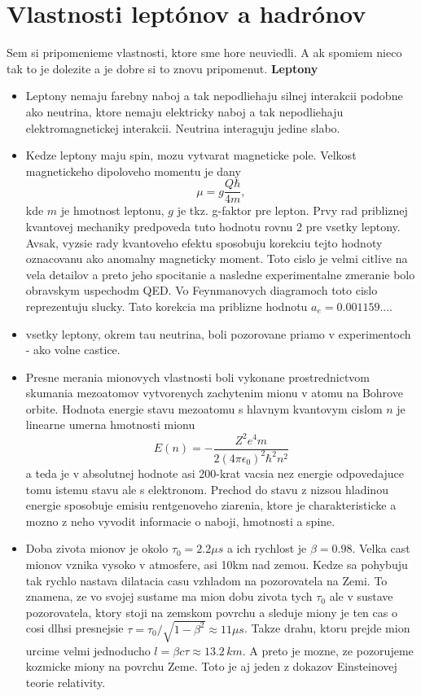 \documentclass[../../main.tex]{subfiles}
\begin{document}
\section{Vlastnosti leptónov a hadrónov}
Sem si pripomenieme vlastnosti, ktore sme hore neuviedli.
A ak spomiem nieco tak to je dolezite a je dobre si to znovu pripomenut.\newline
\textbf{Leptony}
\begin{itemize}

\item Leptony nemaju farebny naboj a tak nepodliehaju silnej interakcii podobne ako neutrina, ktore nemaju elektricky naboj a tak nepodliehaju elektromagnetickej interakcii. Neutrina interaguju jedine slabo.
\item Kedze leptony maju spin, mozu vytvarat magneticke pole. Velkost magnetickeho dipoloveho momentu je dany 
$$\mu=g\frac{Q\hbar}{4m},$$ kde $m$ je hmotnost leptonu, $g$ je tkz. g-faktor pre lepton. Prvy rad pribliznej kvantovej mechaniky predpoveda tuto hodnotu rovnu 2 pre vsetky leptony. Avsak, vyzsie rady kvantoveho efektu sposobuju korekciu tejto hodnoty oznacovanu ako anomalny magneticky moment. Toto cislo je velmi citlive na vela detailov a preto jeho spocitanie a nasledne experimentalne zmeranie bolo obravskym uspechodm QED. Vo Feynmanovych diagramoch toto cislo reprezentuju slucky. Tato korekcia ma priblizne hodnotu $a_e=0.001159....$ 
\item vsetky leptony, okrem tau neutrina, boli pozorovane priamo v experimentoch - ako volne castice.
\item Presne merania mionovych vlastnosti boli vykonane prostrednictvom skumania mezoatomov vytvorenych zachytenim mionu v atomu na Bohrove orbite. Hodnota energie stavu mezoatomu s hlavnym kvantovym cislom $n$ je linearne umerna hmotnosti mionu$$E(n)=-\frac{Z^2e^4m}{2(4\pi\epsilon_0)^2\hbar^2n^2}$$ a teda je v absolutnej hodnote asi 200-krat vacsia nez energie odpovedajuce tomu istemu stavu ale s elektronom. Prechod do stavu z nizsou hladinou energie sposobuje emisiu rentgenoveho ziarenia, ktore je charakteristicke a mozno z neho vyvodit informacie o naboji, hmotnosti a spine.
\item Doba zivota mionov je okolo $\tau_0=2.2\mu s$ a ich rychlost je $\beta=0.98$. Velka cast mionov vznika vysoko v atmosfere, asi 10km nad zemou. Kedze sa pohybuju tak rychlo nastava dilatacia casu vzhladom na pozorovatela na Zemi. To znamena, ze vo svojej sustame ma mion dobu zivota tych $\tau_0$ ale v sustave pozorovatela, ktory stoji na zemskom povrchu a sleduje miony je ten cas o cosi dlhsi presnejsie $\tau=\tau_0/\sqrt{1-\beta^2}\approx11\mu s$. Takze drahu, ktoru prejde mion urcime velmi jednoducho  $l=\beta c\tau \approx 13.2\,km$. A preto je mozne, ze pozorujeme kozmicke miony na povrchu Zeme. Toto je aj jeden z dokazov Einsteinovej teorie relativity.

\end{itemize}
\end{document}
